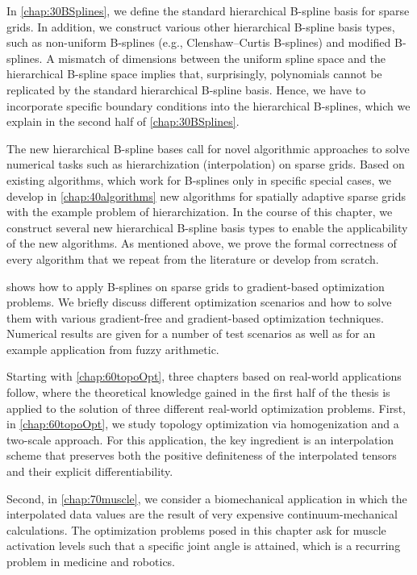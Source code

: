 In \cref{chap:30BSplines}, we define
the standard hierarchical B-spline basis for sparse grids.
In addition, we construct various other hierarchical
B-spline basis types, such as
non-uniform B-splines (e.g., Clenshaw--Curtis B-splines) and
modified B-splines.
A mismatch of dimensions between the uniform spline space and the
hierarchical B-spline space implies that, surprisingly,
polynomials cannot be replicated by the
standard hierarchical B-spline basis.
Hence, we have to incorporate specific boundary conditions
 into the hierarchical B-splines,
which we explain in the second half of \cref{chap:30BSplines}.

The new hierarchical B-spline bases call for novel algorithmic approaches
to solve numerical tasks such as
hierarchization (interpolation) on sparse grids.
Based on existing algorithms,
which work for B-splines only in specific special cases,
we develop in \cref{chap:40algorithms} new algorithms for
spatially adaptive sparse grids with the example problem of hierarchization.
In the course of this chapter, we construct several new
hierarchical B-spline basis types to enable the
applicability of the new algorithms.
As mentioned above, we prove the formal correctness of every algorithm
that we repeat from the literature or develop from scratch.

 shows how to apply B-splines on sparse grids
to gradient-based optimization problems.
We briefly discuss different optimization scenarios and how to solve them
with various gradient-free and gradient-based optimization techniques.
Numerical results are given for a number of test scenarios as well
as for an example application from fuzzy arithmetic.

Starting with \cref{chap:60topoOpt}, three chapters
based on real-world applications follow,
where the theoretical knowledge gained in the first half of the thesis
is applied to the solution of three different real-world optimization problems.
%
First, in \cref{chap:60topoOpt},
we study topology optimization via homogenization
and a two-scale approach.
For this application, the key ingredient is an interpolation scheme
that preserves both the positive definiteness of the interpolated tensors and
their explicit differentiability.

Second, in \cref{chap:70muscle},
we consider a biomechanical application in which the interpolated data values
are the result of very expensive continuum-mechanical calculations.
The optimization problems posed in this chapter ask for
muscle activation levels such that a specific joint angle is attained,
which is a recurring problem in medicine and robotics.

